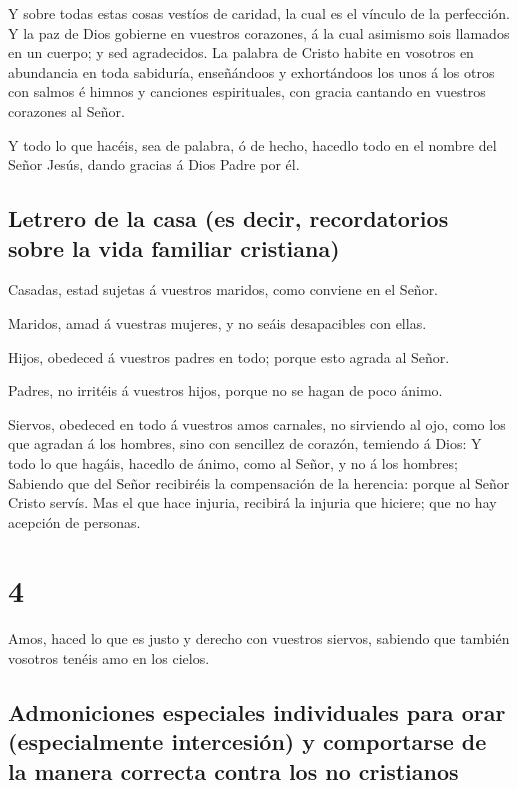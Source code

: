  Y sobre todas estas cosas vestíos de caridad, la cual es
el vínculo de la perfección.  Y la paz de Dios gobierne en
vuestros corazones, á la cual asimismo sois llamados en un cuerpo; y sed
agradecidos.  La palabra de Cristo habite en vosotros en
abundancia en toda sabiduría, enseñándoos y exhortándoos los unos á los
otros con salmos é himnos y canciones espirituales, con gracia cantando
en vuestros corazones al Señor.

 Y todo lo que hacéis, sea de palabra, ó de hecho, hacedlo
todo en el nombre del Señor Jesús, dando gracias á Dios Padre por él.

\hypertarget{letrero-de-la-casa-es-decir-recordatorios-sobre-la-vida-familiar-cristiana}{%
\subsection{Letrero de la casa (es decir, recordatorios sobre la vida
familiar
cristiana)}\label{letrero-de-la-casa-es-decir-recordatorios-sobre-la-vida-familiar-cristiana}}

 Casadas, estad sujetas á vuestros maridos, como conviene
en el Señor.

 Maridos, amad á vuestras mujeres, y no seáis desapacibles
con ellas.

 Hijos, obedeced á vuestros padres en todo; porque esto
agrada al Señor.

 Padres, no irritéis á vuestros hijos, porque no se hagan
de poco ánimo.

 Siervos, obedeced en todo á vuestros amos carnales, no
sirviendo al ojo, como los que agradan á los hombres, sino con sencillez
de corazón, temiendo á Dios:  Y todo lo que hagáis, hacedlo
de ánimo, como al Señor, y no á los hombres;  Sabiendo que
del Señor recibiréis la compensación de la herencia: porque al Señor
Cristo servís.  Mas el que hace injuria, recibirá la
injuria que hiciere; que no hay acepción de personas.

\hypertarget{section-3}{%
\section{4}\label{section-3}}

 Amos, haced lo que es justo y derecho con vuestros siervos,
sabiendo que también vosotros tenéis amo en los cielos.

\hypertarget{admoniciones-especiales-individuales-para-orar-especialmente-intercesiuxf3n-y-comportarse-de-la-manera-correcta-contra-los-no-cristianos}{%
\subsection{Admoniciones especiales individuales para orar
(especialmente intercesión) y comportarse de la manera correcta contra
los no
cristianos}\label{admoniciones-especiales-individuales-para-orar-especialmente-intercesiuxf3n-y-comportarse-de-la-manera-correcta-contra-los-no-cristianos}}

